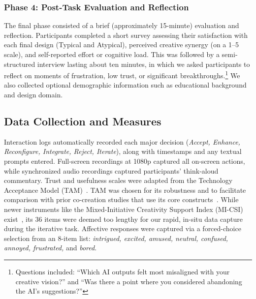 \documentclass[letterpaper]{article} %
\begin{document}
\subsubsection{Phase 4: Post-Task Evaluation and Reflection}
The final phase consisted of a brief (approximately 15-minute) evaluation and reflection. Participants completed a short survey assessing their satisfaction with each final design (Typical and Atypical), perceived creative synergy (on a 1–5 scale), and self-reported effort or cognitive load. This was followed by a semi-structured interview lasting about ten minutes, in which we asked participants to reflect on moments of frustration, low trust, or significant breakthroughs.\footnote{Questions included: “Which AI outputs felt most misaligned with your creative vision?” and “Was there a point where you considered abandoning the AI’s suggestions?”} We also collected optional demographic information such as educational background and design domain.


\subsection{Data Collection and Measures}
Interaction logs automatically recorded each major decision (\textit{Accept, Enhance, Reconfigure, Integrate, Reject, Iterate}), along with timestamps and any textual prompts entered. Full-screen recordings at 1080p captured all on-screen actions, while synchronized audio recordings captured participants' think-aloud commentary. Trust and usefulness scales were adapted from the Technology Acceptance Model (TAM)~\cite{davis1989technology}. TAM was chosen for its robustness and to facilitate comparison with prior co-creation studies that use its core constructs~\cite{dwivedi2023opinion}. While newer instruments like the Mixed-Initiative Creativity Support Index (MI-CSI) exist~\cite{lawton2023drawing}, its 36 items were deemed too lengthy for our rapid, in-situ data capture during the iterative task. Affective responses were captured via a forced-choice selection from an 8-item list: \textit{intrigued, excited, amused, neutral, confused, annoyed, frustrated,} and \textit{bored}.
\end{document}

